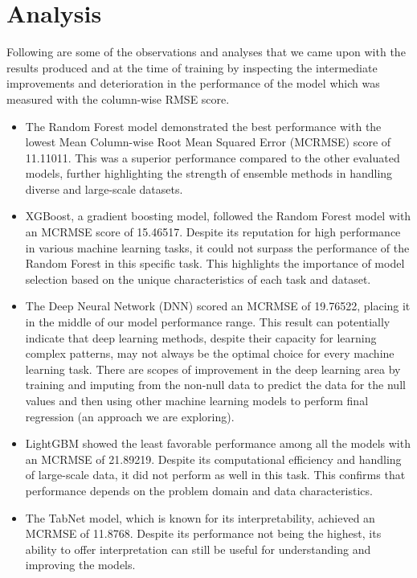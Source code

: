 \documentclass{article}
\begin{document}
\section{Analysis}

Following are some of the observations and analyses that we came upon with the results produced and at the time of training by inspecting the intermediate improvements and deterioration in the performance of the model which was measured with the column-wise RMSE score.

\begin{itemize}
    \item The Random Forest model demonstrated the best performance with the lowest Mean Column-wise Root Mean Squared Error (MCRMSE) score of 11.11011. This was a superior performance compared to the other evaluated models, further highlighting the strength of ensemble methods in handling diverse and large-scale datasets.
    
    \item XGBoost, a gradient boosting model, followed the Random Forest model with an MCRMSE score of 15.46517. Despite its reputation for high performance in various machine learning tasks, it could not surpass the performance of the Random Forest in this specific task. This highlights the importance of model selection based on the unique characteristics of each task and dataset.
    
    \item The Deep Neural Network (DNN) scored an MCRMSE of 19.76522, placing it in the middle of our model performance range. This result can potentially indicate that deep learning methods, despite their capacity for learning complex patterns, may not always be the optimal choice for every machine learning task. There are scopes of improvement in the deep learning area by training and imputing from the non-null data to predict the data for the null values and then using other machine learning models to perform final regression (an approach we are exploring).
    
    \item LightGBM showed the least favorable performance among all the models with an MCRMSE of 21.89219. Despite its computational efficiency and handling of large-scale data, it did not perform as well in this task. This confirms that performance depends on the problem domain and data characteristics.
    
    \item The TabNet model, which is known for its interpretability, achieved an MCRMSE of 11.8768. Despite its performance not being the highest, its ability to offer interpretation can still be useful for understanding and improving the models.
    

\end{itemize}
\end{document}
